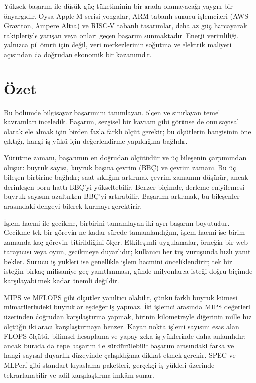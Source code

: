 Yüksek başarım ile düşük güç tüketiminin bir arada olamayacağı yaygın bir önyargıdır. Oysa Apple M serisi yongalar, ARM tabanlı sunucu işlemcileri (AWS Graviton, Ampere Altra) ve RISC-V tabanlı tasarımlar, daha az güç harcayarak rakipleriyle yarışan veya onları geçen başarım sunmaktadır. Enerji verimliliği, yalnızca pil ömrü için değil, veri merkezlerinin soğutma ve elektrik maliyeti açısından da doğrudan ekonomik bir kazanımdır.


\section{Özet}
\label{sec:basarim-ozet}

Bu bölümde bilgisayar başarımını tanımlayan, ölçen ve sınırlayan temel kavramları inceledik. Başarım, sezgisel bir kavram gibi görünse de onu sayısal olarak ele almak için birden fazla farklı ölçüt gerekir; bu ölçütlerin hangisinin öne çıktığı, hangi iş yükü için değerlendirme yapıldığına bağlıdır.

Yürütme zamanı, başarımın en doğrudan ölçütüdür ve üç bileşenin çarpımından oluşur: buyruk sayısı, buyruk başına çevrim (BBÇ) ve çevrim zamanı. Bu üç bileşen birbirine bağlıdır; saat sıklığını artırmak çevrim zamanını düşürür, ancak derinleşen boru hattı BBÇ'yi yükseltebilir. Benzer biçimde, derleme eniyilemesi buyruk sayısını azaltırken BBÇ'yi artırabilir. Başarımı artırmak, bu bileşenler arasındaki dengeyi bilerek kurmayı gerektirir.

İşlem hacmi ile gecikme, birbirini tamamlayan iki ayrı başarım boyutudur. Gecikme tek bir görevin ne kadar sürede tamamlandığını, işlem hacmi ise birim zamanda kaç görevin bitirildiğini ölçer. Etkileşimli uygulamalar, örneğin bir web tarayıcısı veya oyun, gecikmeye duyarlıdır; kullanıcı her tuş vuruşunda hızlı yanıt bekler. Sunucu iş yükleri ise genellikle işlem hacmini önceliklendirir; tek bir isteğin birkaç milisaniye geç yanıtlanması, günde milyonlarca isteği doğru biçimde karşılayabilmek kadar önemli değildir.

MIPS ve MFLOPS gibi ölçütler yanıltıcı olabilir, çünkü farklı buyruk kümesi mimarilerindeki buyruklar eşdeğer iş yapmaz. İki işlemci arasında MIPS değerleri üzerinden doğrudan karşılaştırma yapmak, birinin kilometreyle diğerinin mille hız ölçtüğü iki aracı karşılaştırmaya benzer. Kayan nokta işlemi sayısını esas alan FLOPS ölçütü, bilimsel hesaplama ve yapay zeka iş yüklerinde daha anlamlıdır; ancak burada da tepe başarım ile sürdürülebilir başarım arasındaki farka ve hangi sayısal duyarlık düzeyinde çalışıldığına dikkat etmek gerekir. SPEC ve MLPerf gibi standart kıyaslama paketleri, gerçekçi iş yükleri üzerinde tekrarlanabilir ve adil karşılaştırma imkânı sunar.

